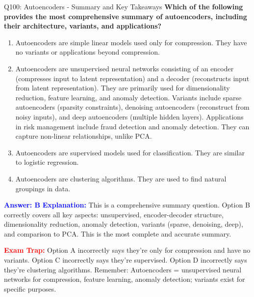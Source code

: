 \documentclass[8pt]{beamer}
\begin{document}
	\begin{frame}{Q100: Autoencoders - Summary and Key Takeaways}
		\fontsize{6.5}{7.5}\selectfont
		\textbf{Which of the following provides the most comprehensive summary of autoencoders, including their architecture, variants, and applications?}
		
		\begin{enumerate}
			\item Autoencoders are simple linear models used only for compression. They have no variants or applications beyond compression.
			\item Autoencoders are unsupervised neural networks consisting of an encoder (compresses input to latent representation) and a decoder (reconstructs input from latent representation). They are primarily used for dimensionality reduction, feature learning, and anomaly detection. Variants include sparse autoencoders (sparsity constraints), denoising autoencoders (reconstruct from noisy inputs), and deep autoencoders (multiple hidden layers). Applications in risk management include fraud detection and anomaly detection. They can capture non-linear relationships, unlike PCA.
			\item Autoencoders are supervised models used for classification. They are similar to logistic regression.
			\item Autoencoders are clustering algorithms. They are used to find natural groupings in data.
		\end{enumerate}
		
		\vspace{0.1cm}
		\textcolor{blue}{\textbf{Answer: B}}
		\vspace{0.1cm}
		\textcolor{blue}{\textbf{Explanation:}} This is a comprehensive summary question. Option B correctly covers all key aspects: unsupervised, encoder-decoder structure, dimensionality reduction, anomaly detection, variants (sparse, denoising, deep), and comparison to PCA. This is the most complete and accurate summary.
		
		\textcolor{red}{\textbf{Exam Trap:}} Option A incorrectly says they're only for compression and have no variants. Option C incorrectly says they're supervised. Option D incorrectly says they're clustering algorithms. Remember: Autoencoders = unsupervised neural networks for compression, feature learning, anomaly detection; variants exist for specific purposes.
	\end{frame}
	
\end{document}
